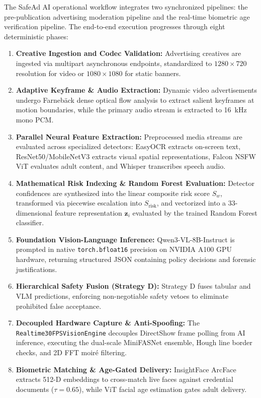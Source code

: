 \documentclass[12pt,a4paper]{report}
\begin{document}
The SafeAd AI operational workflow integrates two synchronized pipelines: the pre-publication advertising moderation pipeline and the real-time biometric age verification pipeline. The end-to-end execution progresses through eight deterministic phases:
\begin{enumerate}
    \item \textbf{Creative Ingestion and Codec Validation:} Advertising creatives are ingested via multipart asynchronous endpoints, standardized to $1280 \times 720$ resolution for video or $1080 \times 1080$ for static banners.
    \item \textbf{Adaptive Keyframe \& Audio Extraction:} Dynamic video advertisements undergo Farneb\"{a}ck dense optical flow analysis to extract salient keyframes at motion boundaries, while the primary audio stream is extracted to 16~kHz mono PCM.
    \item \textbf{Parallel Neural Feature Extraction:} Preprocessed media streams are evaluated across specialized detectors: EasyOCR extracts on-screen text, ResNet50/MobileNetV3 extracts visual spatial representations, Falcon NSFW ViT evaluates adult content, and Whisper transcribes speech audio.
    \item \textbf{Mathematical Risk Indexing \& Random Forest Evaluation:} Detector confidences are synthesized into the linear composite risk score $S_w$, transformed via piecewise escalation into $S_{\text{risk}}$, and vectorized into a 33-dimensional feature representation $\mathbf{z}_i$ evaluated by the trained Random Forest classifier.
    \item \textbf{Foundation Vision-Language Inference:} Qwen3-VL-8B-Instruct is prompted in native \texttt{torch.bfloat16} precision on NVIDIA A100 GPU hardware, returning structured JSON containing policy decisions and forensic justifications.
    \item \textbf{Hierarchical Safety Fusion (Strategy D):} Strategy D fuses tabular and VLM predictions, enforcing non-negotiable safety vetoes to eliminate prohibited false acceptance.
    \item \textbf{Decoupled Hardware Capture \& Anti-Spoofing:} The \texttt{Realtime30FPSVisionEngine} decouples DirectShow frame polling from AI inference, executing the dual-scale MiniFASNet ensemble, Hough line border checks, and 2D FFT moir\'{e} filtering.
    \item \textbf{Biometric Matching \& Age-Gated Delivery:} InsightFace ArcFace extracts 512-D embeddings to cross-match live faces against credential documents ($\tau = 0.65$), while ViT facial age estimation gates adult delivery.
\end{enumerate}
\end{document}
